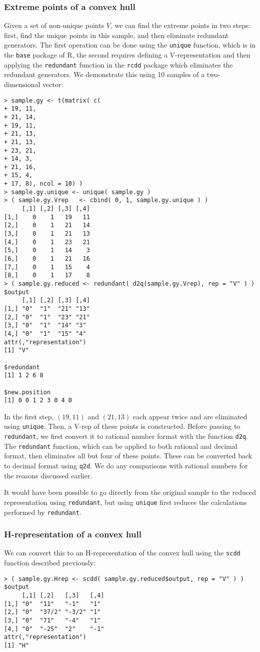 \subsubsection{Extreme points of a convex hull}
Given a set of non-unique points $V$, we can find the extreme points in two steps:
first, find the unique points in this sample, and then eliminate redundant generators.  The first operation can be done using the \texttt{unique} function, 
which is in the \texttt{base} package of R, the second requires defining a V-representation and then applying the \texttt{redundant} function in the \texttt{rcdd}
package which eliminates the redundant generators.
We demonstrate this using 10 samples of a two-dimensional vector:
\begin{verbatim}
> sample.gy <- t(matrix( c(
+ 19, 11,
+ 21, 14,
+ 19, 11,
+ 21, 13,
+ 21, 13,
+ 23, 21,
+ 14, 3,
+ 21, 16,
+ 15, 4,
+ 17, 8), ncol = 10) )
> sample.gy.unique <- unique( sample.gy ) 
> ( sample.gy.Vrep 	 <- cbind( 0, 1, sample.gy.unique ) )
     [,1] [,2] [,3] [,4]
[1,]    0    1   19   11
[2,]    0    1   21   14
[3,]    0    1   21   13
[4,]    0    1   23   21
[5,]    0    1   14    3
[6,]    0    1   21   16
[7,]    0    1   15    4
[8,]    0    1   17    8
> ( sample.gy.reduced <- redundant( d2q(sample.gy.Vrep), rep = "V" ) )
$output
     [,1] [,2] [,3] [,4]
[1,] "0"  "1"  "21" "13"
[2,] "0"  "1"  "23" "21"
[3,] "0"  "1"  "14" "3" 
[4,] "0"  "1"  "15" "4" 
attr(,"representation")
[1] "V"

$redundant
[1] 1 2 6 8

$new.position
[1] 0 0 1 2 3 0 4 0
\end{verbatim}
In the first step, $(19,11)$ and $(21,13)$ each appear twice and are eliminated
using \texttt{unique}.  Then, a V-rep of these points is constructed.  Before
passing to \texttt{redundant}, we first convert it to rational number format
with the function \texttt{d2q}.  The \texttt{redundant} function, which can
be applied to both rational and decimal format, then eliminates
all but four of these points.  These can be converted back to decimal format
using \texttt{q2d}.  We do any comparisons
with rational numbers for the reasons discussed earlier.

It would have been possible to go directly from the original sample to the reduced 
representation using \texttt{redundant}, but using \texttt{unique} first reduces 
the calculations performed by \texttt{redundant}.

\subsubsection{H-representation of a convex hull}
We can convert this to an H-representation of the convex hull 
using the \texttt{scdd} function described previously:
\begin{verbatim}
> ( sample.gy.Hrep <- scdd( sample.gy.reduced$output, rep = "V" ) )
$output
     [,1] [,2]   [,3]   [,4]
[1,] "0"  "11"   "-1"   "1" 
[2,] "0"  "37/2" "-3/2" "1" 
[3,] "0"  "71"   "-4"   "1" 
[4,] "0"  "-25"  "2"    "-1"
attr(,"representation")
[1] "H"
\end{verbatim}

